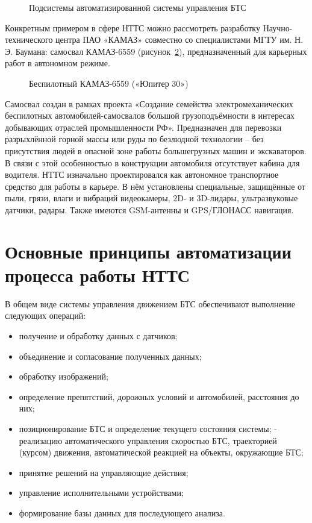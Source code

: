 \begin{figure}[ht]
    \caption{Подсистемы автоматизированной системы управления БТС}\label{fig:system}
\end{figure}


Конкретным примером в сфере НТТС можно рассмотреть разработку Научно-технического центра ПАО «КАМАЗ» совместно со специалистами МГТУ им. Н. Э. Баумана: самосвал КАМАЗ-6559 (рисунок~\cref{fig:ypiter30}), предназначенный для карьерных работ в автономном режиме.

\begin{figure}[ht]
    \caption{Беспилотный КАМАЗ-6559 («Юпитер 30»)}\label{fig:ypiter30}
\end{figure}

Самосвал создан в рамках проекта «Создание семейства электромеханических беспилотных автомобилей-самосвалов большой грузоподъёмности в интересах добывающих отраслей промышленности РФ». Предназначен для перевозки разрыхлённой горной массы или руды по безлюдной технологии – без присутствия людей в опасной зоне работы большегрузных машин и экскаваторов. В связи с этой особенностью в конструкции автомобиля отсутствует кабина для водителя. НТТС изначально проектировался как автономное транспортное средство для работы в карьере. В нём установлены специальные, защищённые от пыли, грязи, влаги и вибраций видеокамеры, 2D- и 3D-лидары, ультразвуковые датчики, радары. Также имеются GSM-антенны и GPS/ГЛОНАСС навигация.

\section{Основные принципы автоматизации процесса работы НТТС}\label{sec:ch1/sec2}

В общем виде системы управления движением БТС обеспечивают выполнение следующих операций:

\begin{itemize}
    \item получение и обработку данных с датчиков;
    \item объединение и согласование полученных данных;
    \item обработку изображений;
    \item определение препятствий, дорожных условий и автомобилей, расстояния до них;
    \item позиционирование БТС и определение текущего состояния системы;
    - реализацию автоматического управления скоростью БТС, траекторией (курсом) движения, автоматической реакцией на объекты, окружающие БТС;
    \item принятие решений на управляющие действия;
    \item управление исполнительными устройствами;
    \item формирование базы данных для последующего анализа.
\end{itemize}

